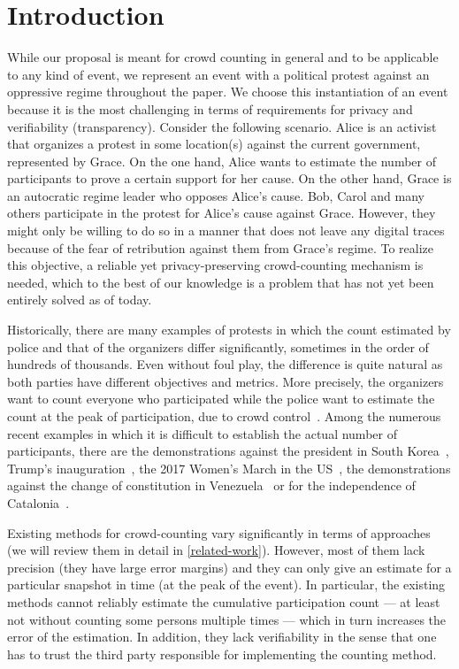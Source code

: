\section{Introduction}%
\label{Introduction}


While our proposal is meant for crowd counting in general and to be applicable to any kind of event, we represent an event with a political protest against an oppressive regime throughout the paper. We choose this instantiation of an event because it is the most challenging in terms of requirements for privacy and verifiability (transparency).
Consider the following scenario.
Alice is an activist that organizes a protest in some location(s) against the current government, represented by Grace.
On the one hand, Alice wants to estimate the number of participants to prove a certain support for her cause.
On the other hand, Grace is an autocratic regime leader who opposes Alice's cause.
Bob, Carol and many others participate in the protest for Alice's cause against Grace.
However, they might only be willing to do so in a manner that does not leave any digital traces because of the fear of retribution against them from Grace's regime. 
To realize this objective, a reliable yet privacy-preserving crowd-counting mechanism is needed, which to the best of our knowledge is a problem that has not yet been entirely solved as of today.

Historically, there are many examples of protests in which the count estimated by police and that of the organizers differ significantly, sometimes in the order of hundreds of thousands.
Even without foul play, the difference is quite natural as both parties have different objectives and metrics.
More precisely, the organizers want to count everyone who participated while the police want to estimate the count at the peak of participation, due to crowd control~\cite{2016DemonstrationsInSeoul}.
Among the numerous recent examples in which it is difficult to establish the actual number of participants, there are the demonstrations against the president in South Korea~\cite{2016DemonstrationsInSeoul}, Trump's inauguration~\cite{HowWillWeKnowTrumpInauguralCrowdSize}, the 2017 Women's March in the US~\cite{2017WomensMarchesInUS}, the demonstrations against the change of constitution in Venezuela~\cite{AlJazeeraOnVenezuela2017} or for the independence of Catalonia~\cite{CataloniaDemonstrations}.

Existing methods for crowd-counting vary significantly in terms of approaches (we will review them in detail in \cref{related-work}).
However, most of them lack precision (\ie they have large error margins) and 
they can only give an estimate for a particular snapshot in time (\eg at the 
peak of the event). In particular, the existing methods cannot reliably 
estimate the cumulative participation count --- at least not without counting 
some persons multiple times --- which in turn increases the error of the 
estimation.
In addition, they lack verifiability in the sense that one has to trust the third party responsible for implementing the counting method. 

